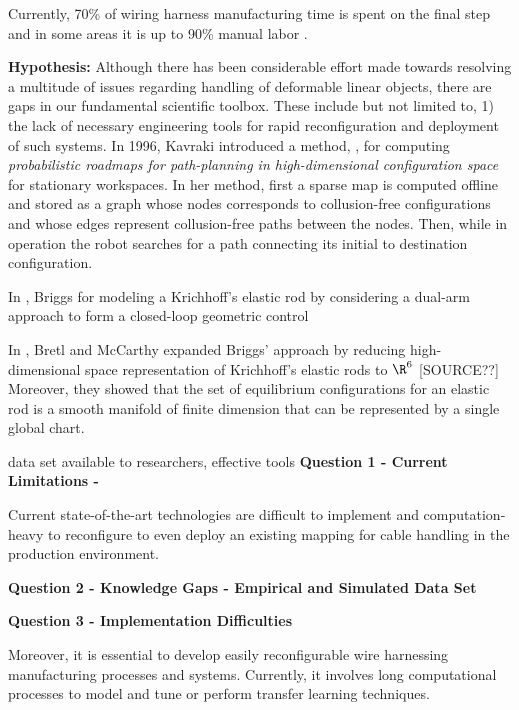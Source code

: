 \documentclass[11pt]{article}
\begin{document}
\begin{itemize}
      Currently, 70\% of wiring harness manufacturing time is spent on the final step and in some areas it is up to 90\% manual labor \cite{nguyen2021manufacturing}.

      \noindent
      \textbf{Hypothesis:} Although there has been considerable effort made towards resolving a multitude
      of issues regarding handling of deformable linear objects, there are gaps in
      our fundamental scientific toolbox. These include but not limited to, 1) the lack of
      necessary engineering tools for rapid reconfiguration and deployment of such
      systems. In 1996, Kavraki introduced a method, \cite{pRoad96}, for computing
      \emph{probabilistic roadmaps for path-planning in high-dimensional configuration space}
      for stationary workspaces. In her method, first a sparse map is computed offline
      and stored as a graph whose nodes corresponds to collusion-free configurations and
      whose edges represent collusion-free paths between the nodes. Then, while in
      operation the robot searches for a path connecting its initial to destination
      configuration.

      \noindent
      In \cite{briggsWire}, Briggs for modeling a Krichhoff's elastic rod by considering a dual-arm approach to form
      a closed-loop geometric control

      \noindent
      In \cite{Quasi-static}, Bretl and McCarthy expanded Briggs' approach by reducing
      high-dimensional space representation of Krichhoff's elastic rods to $\R^6$ [SOURCE??]
      Moreover, they showed that the set of equilibrium configurations for an elastic rod
      is a smooth manifold of finite dimension that can be represented by a single global chart.

      data set available to researchers, effective tools
      \noindent
      \textbf{Question 1 - Current Limitations - }

      Current state-of-the-art technologies are difficult to implement and computation-heavy to reconfigure to even deploy an existing mapping for cable handling in the production environment.

      \noindent
      \textbf{Question 2 - Knowledge Gaps - Empirical and Simulated Data Set}

      \noindent
      \textbf{Question 3 - Implementation Difficulties}

      Moreover, it is essential to develop easily reconfigurable wire harnessing manufacturing processes and systems. Currently, it involves long computational processes to model and tune or perform transfer learning techniques.



\end{itemize}
\end{document}
